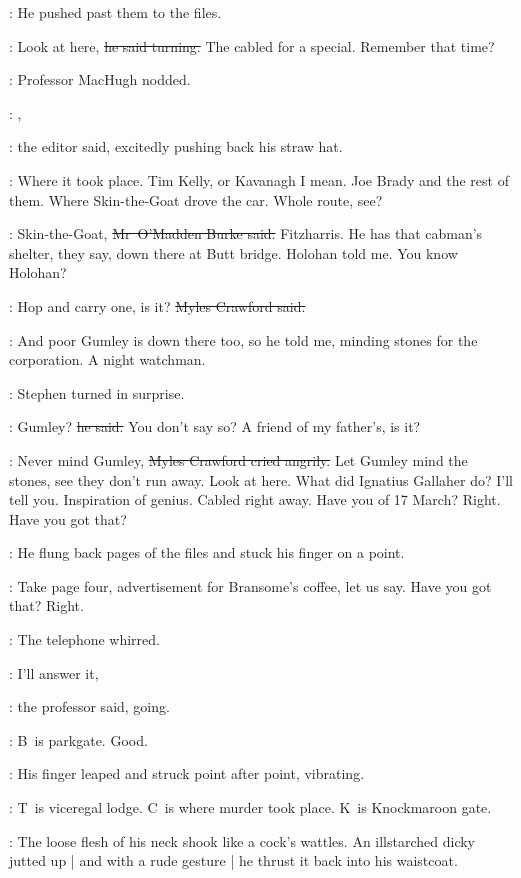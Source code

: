 :
He pushed past them to the files.

\crawford:
Look at here,
\sout{he said turning.}
The  cabled for a special.
Remember that time?

:
Professor MacHugh nodded.

\crawford:
,

:
the editor said,
excitedly pushing back his straw hat.

\crawford:
Where it took place.
Tim Kelly, or Kavanagh I mean.
Joe Brady and the rest of them.
Where Skin-the-Goat drove the car.
Whole route, see?

\omaddenburke:
Skin-the-Goat,
\sout{Mr~O'Madden Burke said.}
Fitzharris.
He has that cabman's shelter, they say,
down there at Butt bridge.
Holohan told me.
You know Holohan?

\crawford:
Hop and carry one,
is it?
\sout{Myles Crawford said.}

\omaddenburke:
And poor Gumley is down there too,
so he told me,
minding stones for the corporation.
A night watchman.

:
Stephen turned in surprise.

\Stephen:
Gumley?
\sout{he said.}
You don't say so?
A friend of my father's,
is it?

\crawford:
Never mind Gumley,
\sout{Myles Crawford cried angrily.}
Let Gumley mind the stones,
see they don't run away.
Look at here.
What did Ignatius Gallaher do?
I'll tell you.
Inspiration of genius.
Cabled right away.
Have you  of 17 March?
Right.
Have you got that?

:
He flung back pages of the files
and stuck his finger on a point.

\crawford:
Take page four,
advertisement for Bransome's coffee,
let us say.
Have you got that?
Right.

:
The telephone whirred.



\machugh:
I'll answer it,

:
the professor said,
going.

\crawford:
B~is parkgate.
Good.

:
His finger leaped and struck point after point,
vibrating.

\crawford:
T~is viceregal lodge.
C~is where murder took place.
K~is Knockmaroon gate.

:
The loose flesh of his neck shook like a cock's wattles.
An illstarched dicky jutted up |
and with a rude gesture |
he thrust it back into his waistcoat.

